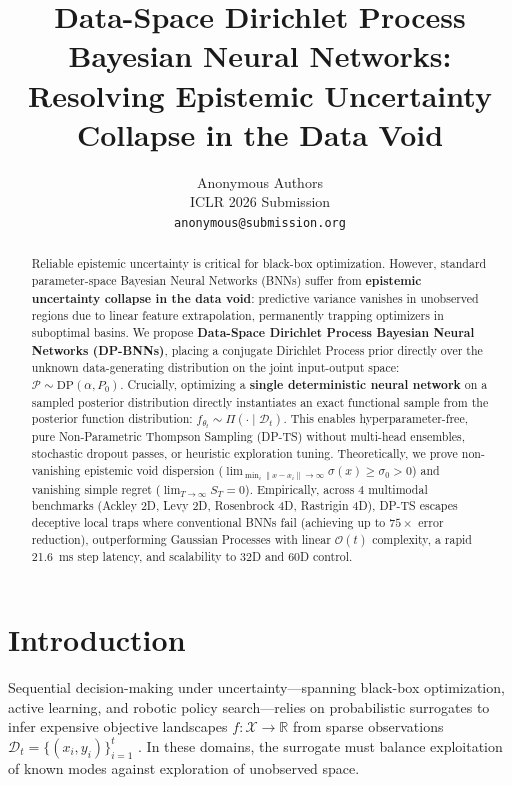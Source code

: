 \documentclass{article}
\title{Data-Space Dirichlet Process Bayesian Neural Networks: Resolving Epistemic Uncertainty Collapse in the Data Void}
\author{Anonymous Authors \\
ICLR 2026 Submission \\
\texttt{anonymous@submission.org}
}
\begin{document}
\maketitle

\begin{abstract}
Reliable epistemic uncertainty is critical for black-box optimization. However, standard parameter-space Bayesian Neural Networks (BNNs) suffer from \textbf{epistemic uncertainty collapse in the data void}: predictive variance vanishes in unobserved regions due to linear feature extrapolation, permanently trapping optimizers in suboptimal basins. We propose \textbf{Data-Space Dirichlet Process Bayesian Neural Networks (DP-BNNs)}, placing a conjugate Dirichlet Process prior directly over the unknown data-generating distribution on the joint input-output space: $\mathcal{P} \sim \mathrm{DP}(\alpha, P_0)$. Crucially, optimizing a \textbf{single deterministic neural network} on a sampled posterior distribution directly instantiates an exact functional sample from the posterior function distribution: $f_{\theta_t} \sim \Pi(\cdot \mid \mathcal{D}_t)$. This enables hyperparameter-free, pure Non-Parametric Thompson Sampling (DP-TS) without multi-head ensembles, stochastic dropout passes, or heuristic exploration tuning. Theoretically, we prove non-vanishing epistemic void dispersion ($\lim_{\min_i \|x - x_i\| \to \infty} \sigma(x) \ge \sigma_0 > 0$) and vanishing simple regret ($\lim_{T \to \infty} S_T = 0$). Empirically, across 4 multimodal benchmarks (Ackley 2D, Levy 2D, Rosenbrock 4D, Rastrigin 4D), DP-TS escapes deceptive local traps where conventional BNNs fail (achieving up to $75\times$ error reduction), outperforming Gaussian Processes with linear $\mathcal{O}(t)$ complexity, a rapid 21.6~ms step latency, and scalability to 32D and 60D control.
\end{abstract}

\section{Introduction}
\label{sec:intro}
Sequential decision-making under uncertainty---spanning black-box optimization, active learning, and robotic policy search---relies on probabilistic surrogates to infer expensive objective landscapes $f: \mathcal{X} \to \mathbb{R}$ from sparse observations $\mathcal{D}_t = \{(x_i, y_i)\}_{i=1}^t$ \citep{snoek2012practical,shahriari2015taking}. In these domains, the surrogate must balance exploitation of known modes against exploration of unobserved space.
\end{document}
